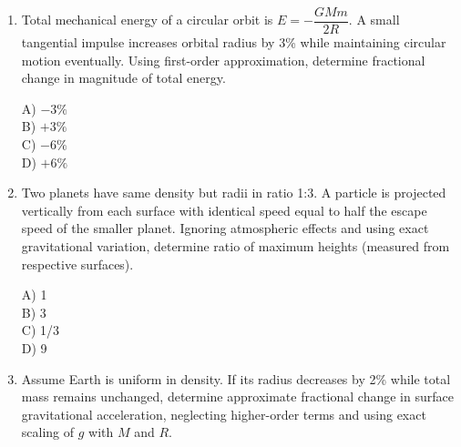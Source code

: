 \documentclass[12pt]{article}
\begin{document}
\begin{enumerate}
\begin{center}
\textbf{Diagram for Question 5}
\end{center}

A) Circular with smaller radius \\
B) Elliptical with perigee at present point \\
C) Elliptical with apogee at present point \\
D) Radially inward collapse

\item Total mechanical energy of a circular orbit is $E=-\dfrac{GMm}{2R}$. A small tangential impulse increases orbital radius by 3\% while maintaining circular motion eventually. Using first-order approximation, determine fractional change in magnitude of total energy.

A) $-3\%$ \\
B) $+3\%$ \\
C) $-6\%$ \\
D) $+6\%$

\item Two planets have same density but radii in ratio 1:3. A particle is projected vertically from each surface with identical speed equal to half the escape speed of the smaller planet. Ignoring atmospheric effects and using exact gravitational variation, determine ratio of maximum heights (measured from respective surfaces).

A) 1 \\
B) 3 \\
C) 1/3 \\
D) 9

\item Assume Earth is uniform in density. If its radius decreases by 2\% while total mass remains unchanged, determine approximate fractional change in surface gravitational acceleration, neglecting higher-order terms and using exact scaling of $g$ with $M$ and $R$.


\end{enumerate}
\end{document}
